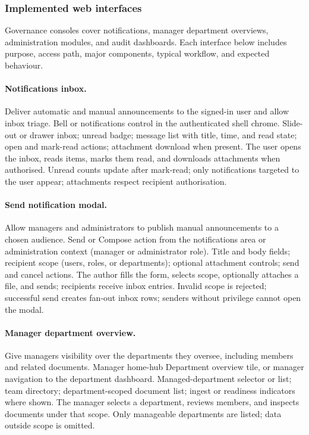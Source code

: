 \subsubsection{Implemented web interfaces}
\label{subsubsec:impl-s4-ui}

Governance consoles cover notifications, manager department overviews,
administration modules, and audit dashboards. Each interface below includes
purpose, access path, major components, typical workflow, and expected behaviour.

\paragraph{Notifications inbox.}
\uiexplain
{Deliver automatic and manual announcements to the signed-in user and allow
inbox triage.}
{Bell or notifications control in the authenticated shell chrome.}
{Slide-out or drawer inbox; unread badge; message list with title, time, and
read state; open and mark-read actions; attachment download when present.}
{The user opens the inbox, reads items, marks them read, and downloads
attachments when authorised.}
{Unread counts update after mark-read; only notifications targeted to the user
appear; attachments respect recipient authorisation.}

\paragraph{Send notification modal.}
\uiexplain
{Allow managers and administrators to publish manual announcements to a chosen
audience.}
{Send or Compose action from the notifications area or administration context
(manager or administrator role).}
{Title and body fields; recipient scope (users, roles, or departments); optional
attachment controls; send and cancel actions.}
{The author fills the form, selects scope, optionally attaches a file, and
sends; recipients receive inbox entries.}
{Invalid scope is rejected; successful send creates fan-out inbox rows; senders
without privilege cannot open the modal.}

\paragraph{Manager department overview.}
\uiexplain
{Give managers visibility over the departments they oversee, including members
and related documents.}
{Manager home-hub Department overview tile, or manager navigation to the
department dashboard.}
{Managed-department selector or list; team directory; department-scoped document
list; ingest or readiness indicators where shown.}
{The manager selects a department, reviews members, and inspects documents under
that scope.}
{Only manageable departments are listed; data outside scope is omitted.}

